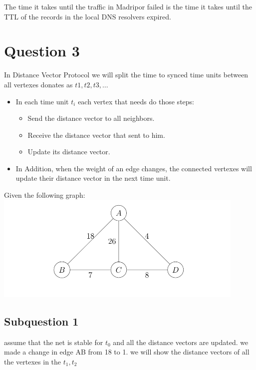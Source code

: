 \documentclass{article}
\begin{document}
The time it takes until the traffic in Madripor failed is the time it takes until the TTL of the records in the local DNS resolvers expired.
\section{Question 3}

In Distance Vector Protocol we will split the time to synced time units between all vertexes donates as $t1, t2, t3,\dots$ 
\begin{itemize}
    \item In each time unit $t_i$ each vertex that needs do those steps:
    \begin{itemize}
        \item Send the distance vector to all neighbors.
            \item Receive the distance vector that sent to him.
            \item Update its distance vector.
    \end{itemize}           
    \item In Addition, when the weight of an edge changes, the connected vertexes will update their distance vector in the next time unit.
\end{itemize}
Given the following graph: \\
\includegraphics[width=0.9\textwidth]{Screenshot 2024-06-28 at 14.59.41.png}

\subsection{Subquestion 1}
assume that the net is stable for $t_0$ and all the distance vectors are updated.
we made a change in edge AB from 18 to 1. we will show the distance vectors of all the vertexes in the $t_1,t_2$\\
\end{document}
